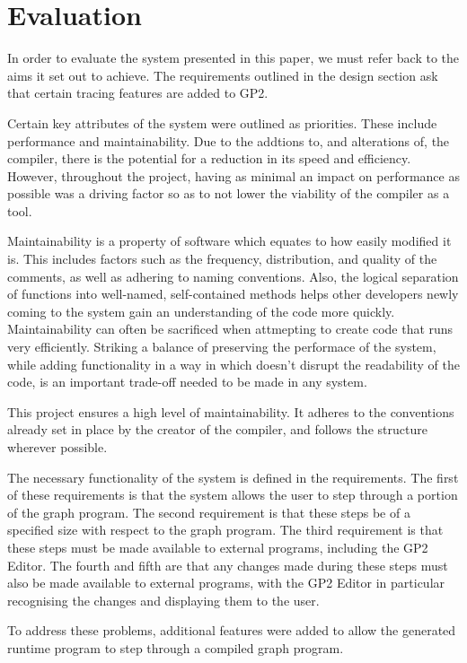 \documentclass{UoYCSproject}
\begin{document}
\chapter{Evaluation}

In order to evaluate the system presented in this paper, we must refer back to the aims it set out to achieve. The requirements outlined in the design section ask that certain tracing features are added to GP2. 

Certain key attributes of the system were outlined as priorities. These include performance and maintainability.
Due to the addtions to, and alterations of, the compiler, there is the potential for a reduction in its speed and efficiency. However, throughout the project, having as minimal an impact on performance as possible was a driving factor so as to not lower the viability of the compiler as a tool.

Maintainability is a property of software which equates to how easily modified it is. This includes factors such as the frequency, distribution, and quality of the comments, as well as adhering to naming conventions. Also, the logical separation of functions into well-named, self-contained methods helps other developers newly coming to the system gain an understanding of the code more quickly. Maintainability can often be sacrificed when attmepting to create code that runs very efficiently. Striking a balance of preserving the performace of the system, while adding functionality in a way in which doesn't disrupt the readability of the code, is an important trade-off needed to be made in any system.

This project ensures a high level of maintainability. It adheres to the conventions already set in place by the creator of the compiler, and follows the structure wherever possible.

The necessary functionality of the system is defined in the requirements. The first of these requirements is that the system allows the user to step through a portion of the graph program. The second requirement is that these steps be of a specified size with respect to the graph program. The third requirement is that these steps must be made available to external programs, including the GP2 Editor. The fourth and fifth are that any changes made during these steps must also be made available to external programs, with the GP2 Editor in particular recognising the changes and displaying them to the user.

To address these problems, additional features were added to allow the generated runtime program to step through a compiled graph program. 
\end{document}
